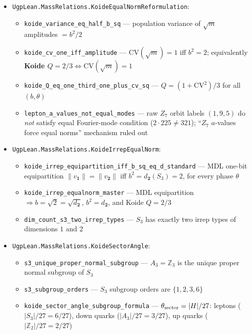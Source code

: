 \documentclass[11pt]{article}
\theoremstyle{remark}
\begin{document}
\begin{itemize}[leftmargin=1.3em,itemsep=0.1em]
\begin{itemize}[leftmargin=1.3em,itemsep=0.05em]
      \item \nolinkurl{equal_norm_iff_amplitude} --- equal $S_3$-irrep norm iff $b^2=2$
      \item \nolinkurl{cone_amplitude_eq_sqrt2} --- equal norm and $b\ge0$ imply $b=\sqrt{2}$
      \item \nolinkurl{koide_cone_pinned} --- master: at $b=\sqrt{2}$, $\theta=2/9$, both $Q=2/3$ and equal norm hold
    \end{itemize}
  \item \nolinkurl{UgpLean.MassRelations.KoideEqualNormReformulation}:
    \begin{itemize}[leftmargin=1.3em,itemsep=0.05em]
      \item \nolinkurl{koide_variance_eq_half_b_sq} --- population variance of $\sqrt{m}$ amplitudes $= b^2/2$
      \item \nolinkurl{koide_cv_one_iff_amplitude} --- $\mathrm{CV}(\sqrt{m})=1$ iff $b^2=2$; equivalently \textbf{Koide $Q=2/3 \Leftrightarrow \mathrm{CV}(\sqrt{m})=1$}
      \item \nolinkurl{koide_Q_eq_one_third_one_plus_cv_sq} --- $Q=(1+\mathrm{CV}^2)/3$ for all $(b,\theta)$
      \item \nolinkurl{lepton_a_values_not_equal_modes} --- raw $Z_7$ orbit labels $(1,9,5)$ do \emph{not} satisfy equal Fourier-mode condition ($2\cdot 225\ne 321$); ``$Z_7$ $a$-values force equal norms'' mechanism ruled out
    \end{itemize}
  \item \nolinkurl{UgpLean.MassRelations.KoideIrrepEqualNorm}:
    \begin{itemize}[leftmargin=1.3em,itemsep=0.05em]
      \item \nolinkurl{koide_irrep_equipartition_iff_b_sq_eq_d_standard} --- MDL one-bit equipartition $\|v_{\mathbf 1}\|=\|v_{\mathbf 2}\|$ iff $b^2 = d_{\mathbf 2}(S_3) = 2$, for every phase $\theta$
      \item \nolinkurl{koide_irrep_equalnorm_master} --- MDL equipartition $\Rightarrow b=\sqrt{2}=\sqrt{d_{\mathbf 2}}$, $b^2=d_{\mathbf 2}$, and Koide $Q=2/3$
      \item \nolinkurl{dim_count_s3_two_irrep_types} --- $S_3$ has exactly two irrep types of dimensions $1$ and $2$
    \end{itemize}
  \item \nolinkurl{UgpLean.MassRelations.KoideSectorAngle}:
    \begin{itemize}[leftmargin=1.3em,itemsep=0.05em]
      \item \nolinkurl{s3_unique_proper_normal_subgroup} --- $A_3 = \mathbb{Z}_3$ is the unique proper normal subgroup of $S_3$
      \item \nolinkurl{s3_subgroup_orders} --- $S_3$ subgroup orders are $\{1,2,3,6\}$
      \item \nolinkurl{koide_sector_angle_subgroup_formula} --- $\theta_{\rm sector} = |H|/27$: leptons ($|S_3|/27 = 6/27$), down quarks ($|A_3|/27 = 3/27$), up quarks ($|\mathbb{Z}_2|/27 = 2/27$)
    \end{itemize}
\end{itemize}
\end{document}
